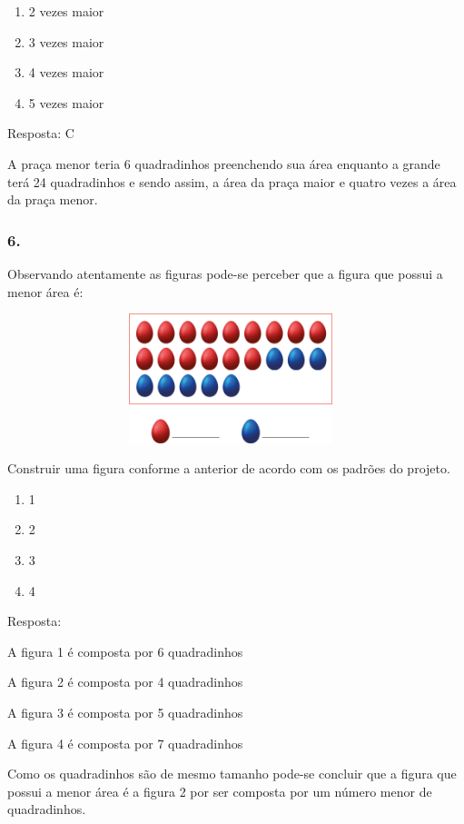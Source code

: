 \begin{enumerate}
\def\labelenumi{\alph{enumi})}
\item
  2 vezes maior
\item
  3 vezes maior
\item
  4 vezes maior
\item
  5 vezes maior
\end{enumerate}

Resposta: C

A praça menor teria 6 quadradinhos preenchendo sua área enquanto a
grande terá 24 quadradinhos e sendo assim, a área da praça maior e
quatro vezes a área da praça menor.

\subsubsection{6.}\label{section-57}

Observando atentamente as figuras pode-se perceber que a figura que
possui a menor área é:

\includegraphics[width=5.12179in,height=1.48342in]{media/image65.png}

Construir uma figura conforme a anterior de acordo com os padrões do
projeto.

\begin{enumerate}
\def\labelenumi{\alph{enumi})}
\item
  1
\item
  2
\item
  3
\item
  4
\end{enumerate}

Resposta:

A figura 1 é composta por 6 quadradinhos

A figura 2 é composta por 4 quadradinhos

A figura 3 é composta por 5 quadradinhos

A figura 4 é composta por 7 quadradinhos

Como os quadradinhos são de mesmo tamanho pode-se concluir que a figura
que possui a menor área é a figura 2 por ser composta por um número
menor de quadradinhos.

